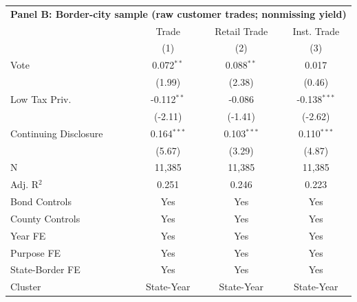 \begingroup
\centering
\begin{tabular*}{\textwidth}{@{\extracolsep{\fill}}lccc}
\multicolumn{5}{l}{\textbf{Panel B: Border-city sample (raw customer trades; nonmissing yield)}}\\

\addlinespace
   \toprule
                         & Trade         & Retail Trade  & Inst. Trade\\  
                         & (1)           & (2)           & (3)\\  
   \midrule 
   Vote                  & 0.072$^{**}$  & 0.088$^{**}$  & 0.017\\   
                         & (1.99)       & (2.38)       & (0.46)\\   
   Low Tax Priv.         & -0.112$^{**}$ & -0.086        & -0.138$^{***}$\\   
                         & (-2.11)      & (-1.41)      & (-2.62)\\   
   Continuing Disclosure & 0.164$^{***}$ & 0.103$^{***}$ & 0.110$^{***}$\\   
                         & (5.67)       & (3.29)       & (4.87)\\   
   \hline
   N          & 11,385        & 11,385        & 11,385\\  
   Adj. R$^2$        & 0.251         & 0.246         & 0.223\\  
   Bond Controls         & Yes           & Yes           & Yes\\  
   County Controls       & Yes           & Yes           & Yes\\  
   Year FE               & Yes           & Yes           & Yes\\  
   Purpose FE            & Yes           & Yes           & Yes\\  
   State-Border FE       & Yes           & Yes           & Yes\\  
   Cluster              & State-Year & State-Year & State-Year\\  
   \bottomrule
\end{tabular*}
\par\endgroup
